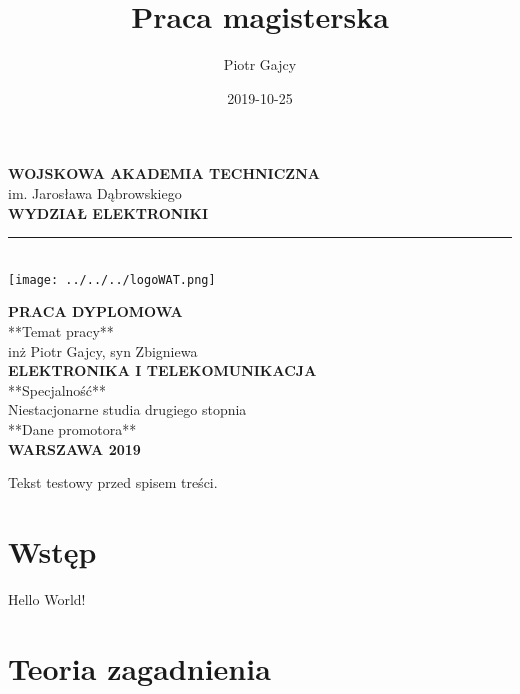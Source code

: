 \documentclass[a4paper, 12pt, twoside, openright]{report}
\title{Praca magisterska}
\date{2019-10-25}
\author{Piotr Gajcy}
\begin{document}
\begin{titlepage}
	\centering
	{\large \textbf{WOJSKOWA AKADEMIA TECHNICZNA}} \\
	{\large im. Jarosława Dąbrowskiego} \\
	{\large \textbf{WYDZIAŁ ELEKTRONIKI}} \\
	\noindent\rule{\textwidth}{4pt} \\
	\vspace{10pt}
	\texttt{[image: ../../../logoWAT.png]}\par\vspace{1cm}
	\vspace{20pt}
	{\LARGE \textbf{PRACA DYPLOMOWA}} \\
	\vspace{30pt}
	**Temat pracy** \\ 
	\vspace{10pt}
	inż Piotr Gajcy, syn Zbigniewa	\\ 
	\vspace{10pt}
	{\large \textbf{ELEKTRONIKA I TELEKOMUNIKACJA}} \\ 
	\vspace{10pt}
	**Specjalność** \\ 
	\vspace{10pt}
	Niestacjonarne studia drugiego stopnia \\ 
	\vspace{10pt}
	**Dane promotora** \\ 
	
	\vspace*{\fill}
	{\large \textbf{WARSZAWA 2019}}
	
\end{titlepage}
\newpage
  
Tekst testowy przed spisem treści.
  
\newpage
{}
\setcounter{page}{5}
\tableofcontents
\newpage
    
\chapter*{Wstęp}
Hello World!

\chapter{Teoria zagadnienia}
 
\end{document}

